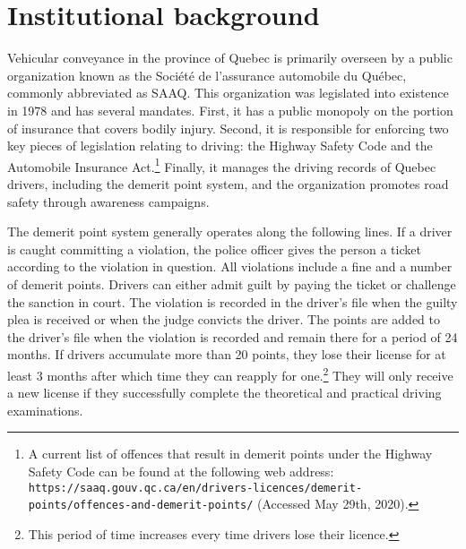 \section{Institutional background}
\label{sec:Background}

Vehicular conveyance in the province of Quebec is primarily overseen by a public organization known as the Soci\'{e}t\'{e} de l'assurance automobile du Qu\'{e}bec, commonly abbreviated as SAAQ. This organization was legislated into existence in 1978 and has several mandates. First, it has a public monopoly on the portion of insurance that covers bodily injury. Second, it is responsible for enforcing two key pieces of legislation relating to driving: the Highway Safety Code and the Automobile Insurance Act.\footnote{%
A current list of offences that result in demerit points under the Highway Safety Code can be found at the following web address: \texttt{https://saaq.gouv.qc.ca/en/drivers-licences/demerit-points/offences-and-demerit-points/} (Accessed May 29th, 2020).}
Finally, it manages the driving records of Quebec drivers, including the demerit point system, and the organization promotes road safety through awareness campaigns.

The demerit point system generally operates along the following lines. If a driver is caught committing a violation, the police officer gives the person a ticket according to the violation in question. All violations include a fine and a number of demerit points. Drivers can either admit guilt by paying the ticket or challenge the sanction in court. The violation is recorded in the driver’s file when the guilty plea is received or when the judge convicts the driver. The points are added to the driver’s file when the violation is recorded and remain there for a period of 24 months. If drivers accumulate more than 20 points, they lose their license for at least 3 months after which time they can reapply for one.\footnote{%
This period of time increases every time drivers lose their licence.}
They will only receive a new license if they successfully complete the theoretical and practical driving examinations.

